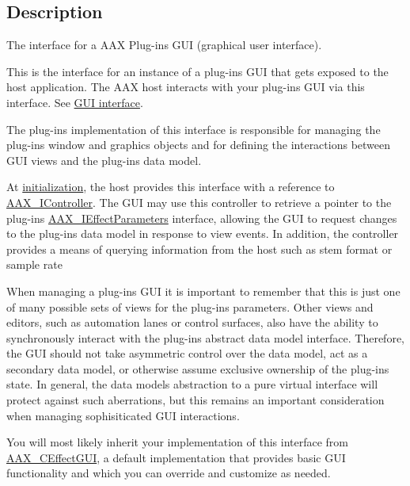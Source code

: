 \subsection{Description}
The interface for a A\+A\+X Plug-\/in\textquotesingle{}s G\+U\+I (graphical user interface). 

This is the interface for an instance of a plug-\/in\textquotesingle{}s G\+U\+I that gets exposed to the host application. The A\+A\+X host interacts with your plug-\/in\textquotesingle{}s G\+U\+I via this interface. See \hyperlink{a00329}{G\+U\+I interface}.

The plug-\/in\textquotesingle{}s implementation of this interface is responsible for managing the plug-\/in\textquotesingle{}s window and graphics objects and for defining the interactions between G\+U\+I views and the plug-\/in\textquotesingle{}s data model.

At \hyperlink{a00060_aac9d8ab88172ac594d86ac2441522fec}{initialization}, the host provides this interface with a reference to \hyperlink{a00090}{A\+A\+X\+\_\+\+I\+Controller}. The G\+U\+I may use this controller to retrieve a pointer to the plug-\/in\textquotesingle{}s \hyperlink{a00099}{A\+A\+X\+\_\+\+I\+Effect\+Parameters} interface, allowing the G\+U\+I to request changes to the plug-\/in\textquotesingle{}s data model in response to view events. In addition, the controller provides a means of querying information from the host such as stem format or sample rate

When managing a plug-\/in\textquotesingle{}s G\+U\+I it is important to remember that this is just one of many possible sets of views for the plug-\/in\textquotesingle{}s parameters. Other views and editors, such as automation lanes or control surfaces, also have the ability to synchronously interact with the plug-\/in\textquotesingle{}s abstract data model interface. Therefore, the G\+U\+I should not take asymmetric control over the data model, act as a secondary data model, or otherwise assume exclusive ownership of the plug-\/in\textquotesingle{}s state. In general, the data model\textquotesingle{}s abstraction to a pure virtual interface will protect against such aberrations, but this remains an important consideration when managing sophisiticated G\+U\+I interactions.

You will most likely inherit your implementation of this interface from \hyperlink{a00017}{A\+A\+X\+\_\+\+C\+Effect\+G\+U\+I}, a default implementation that provides basic G\+U\+I functionality and which you can override and customize as needed.

